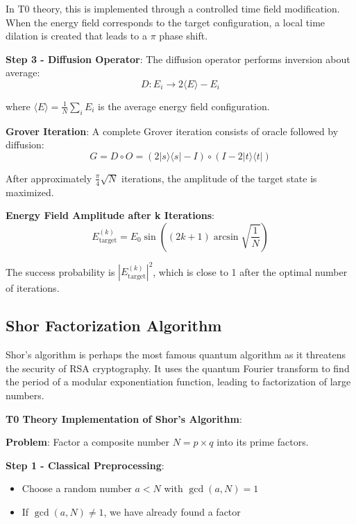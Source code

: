 \documentclass[12pt,a4paper]{article}
\theoremstyle{definition}
\theoremstyle{remark}
\begin{document}
	In T0 theory, this is implemented through a controlled time field modification. When the energy field corresponds to the target configuration, a local time dilation is created that leads to a $\pi$ phase shift.
	
	\textbf{Step 3 - Diffusion Operator}:
	The diffusion operator performs inversion about average:
	\begin{equation}
		D: E_i \rightarrow 2\langle E \rangle - E_i
	\end{equation}
	
	where $\langle E \rangle = \frac{1}{N}\sum_i E_i$ is the average energy field configuration.
	
	\textbf{Grover Iteration}:
	A complete Grover iteration consists of oracle followed by diffusion:
	\begin{equation}
		G = D \circ O = (2|s\rangle\langle s| - I) \circ (I - 2|t\rangle\langle t|)
	\end{equation}
	
	After approximately $\frac{\pi}{4}\sqrt{N}$ iterations, the amplitude of the target state is maximized.
	
	\textbf{Energy Field Amplitude after k Iterations}:
	\begin{equation}
		E_{\text{target}}^{(k)} = E_0 \sin\left((2k+1)\arcsin\sqrt{\frac{1}{N}}\right)
	\end{equation}
	
	The success probability is $|E_{\text{target}}^{(k)}|^2$, which is close to 1 after the optimal number of iterations.
	
	\subsection{Shor Factorization Algorithm}
	
	Shor's algorithm is perhaps the most famous quantum algorithm as it threatens the security of RSA cryptography. It uses the quantum Fourier transform to find the period of a modular exponentiation function, leading to factorization of large numbers.
	
	\textbf{T0 Theory Implementation of Shor's Algorithm}:
	
	\textbf{Problem}: Factor a composite number $N = p \times q$ into its prime factors.
	
	\textbf{Step 1 - Classical Preprocessing}:
	\begin{itemize}
		\item Choose a random number $a < N$ with $\gcd(a, N) = 1$
		\item If $\gcd(a, N) \neq 1$, we have already found a factor
	\end{itemize}
	
\end{document}
